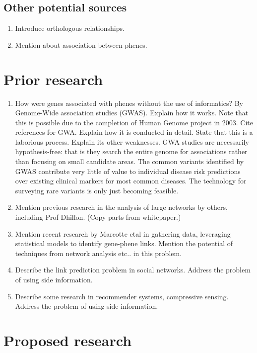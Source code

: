 \documentclass[11pt]{article}
\begin{document}
\subsection{Other potential sources}
\begin{enumerate}
 \item Introduce orthologous relationships.
 \item Mention about association between phenes.
\end{enumerate}

\section{Prior research}
\begin{enumerate}
 \item How were genes associated with phenes without the use of informatics? By Genome-Wide association studies (GWAS).
  \subitem Explain how it works. Note that this is possible due to the completion of Human Genome project in 2003.
  \subsubitem Cite references for GWA.
  \subitem Explain how it is conducted in detail. State that this is a laborious process.
  \subitem Explain its other weaknesses.
   \subsubitem GWA studies are necessarily hypothesis-free: that is they search the entire genome for associations rather than focusing on small candidate areas.
   \subsubitem The common variants identified by GWAS contribute very little of value to individual disease risk predictions over existing clinical markers for most common diseases. The technology for surveying rare variants is only just becoming feasible.
 \item Mention previous research in the analysis of large networks by others, including Prof Dhillon. (Copy parts from whitepaper.)
 \item Mention recent research by Marcotte etal in gathering data, leveraging statistical models to identify gene-phene links. Mention the potential of techniques from network analysis etc.. in this problem.
 \item Describe the link prediction problem in social networks. Address the problem of using side information.
 \item Describe some research in recommender systems, compressive sensing. Address the problem of using side information.
\end{enumerate}



\section{Proposed research}
\end{document}
